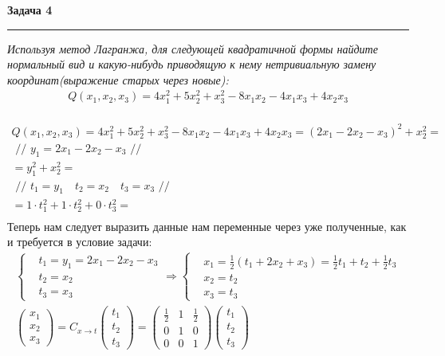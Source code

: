 \documentclass[a4paper,11pt]{article}
\begin{document}
\textbf{\large Задача 4}
\medskip\hrule\medskip
\textit{Используя метод Лагранжа, для следующей квадратичной формы найдите нормальный вид и какую-нибудь приводящую к нему нетривиальную замену координат(выражение старых через новые):}
\begin{align*}
	Q(x_1, x_2, x_3) = 4x_1^2 + 5x_2^2 + x_3^2 - 8x_1x_2 - 4x_1x_3 + 4x_2x_3
\end{align*} \\
\begin{gather*}
Q(x_1, x_2, x_3) 
= 4x_1^2 + 5x_2^2 + x_3^2 - 8x_1x_2 - 4x_1x_3 + 4x_2x_3
= (2x_1 - 2x_2 - x_3)^2 + x_2^2 = \\
\text{ // } y_1 = 2x_1 - 2x_2 - x_3 \text{ // } \\ 
= y_1^2 + x_2^2 = \\[2pt]
\text{ // } t_1 =  y_1 \quad t_2 = x_2 \quad t_3 = x_3 \text{ // } \\
= 1 \cdot t_1^2 + 1 \cdot t_2^2 + 0 \cdot t_3^2 = \\
\end{gather*}
Теперь нам следует выразить данные нам переменные через уже полученные, как и требуется в условие задачи:
\begin{gather*}
\begin{cases}
&t_1 = y_1 = 2x_1 - 2x_2 - x_3 \\
&t_2 = x_2 \\
&t_3 = x_3
\end{cases}
\Rightarrow
\begin{cases}
&x_1 = \frac12(t_1 + 2x_2 + x_3) = \frac12 t_1 + t_2 + \frac12 t_3 \\
&x_2 = t_2 \\
&x_3 = t_3 
\end{cases} \\[3pt]
\begin{pmatrix}
x_1 \\ x_2 \\ x_3
 \end{pmatrix}
= 
C_{x \to t}
\begin{pmatrix}
t_1 \\ t_2 \\ t_3
\end{pmatrix} 
= 
\begin{pmatrix}
\frac12 & 1 & \frac12 \\[2pt]
0 & 1 & 0 \\[2pt]
0 & 0 & 1
\end{pmatrix}
\begin{pmatrix}
t_1 \\ t_2 \\ t_3
\end{pmatrix} 
\end{gather*}
\end{document}
